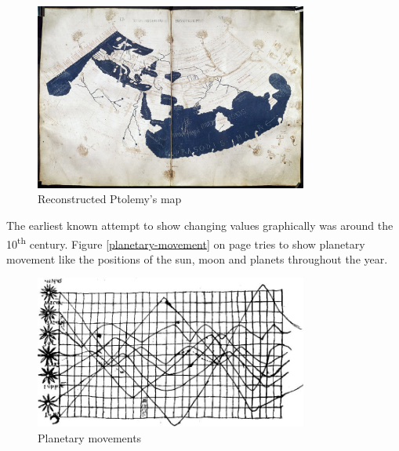 \begin{figure}[h]
\centering
\includegraphics[width=0.8\textwidth,keepaspectratio]{images/history/ptolemy-map.jpg}
\caption[
    Reconstructed Ptolemy's map, Urldate: 07.2016 \newline
\small\texttt{\url{https://upload.wikimedia.org/wikipedia/commons/2/23/PtolemyWorldMap.jpg}}
]{Reconstructed Ptolemy's map}
\label{fig:ptolemy}
\end{figure}

The earliest known attempt to show changing values graphically was around the 10\textsuperscript{th} century. Figure \ref{planetary-movement} on page \pageref{planetary-movement} tries to show planetary
movement like the positions of the sun, moon and planets throughout the year.

\begin{figure}[h]
\centering
\includegraphics[width=0.8\textwidth,keepaspectratio]{images/history/planetary-movement.jpg}
\caption[
    Planetary movements, Urldate: 07.2016 \newline
\small\texttt{\url{http://www.fi.uu.nl/wiskrant/artikelen/hist_grafieken/begin/images/planeten.gif}}
]{Planetary movements}
\label{fig:planetary-movement}
\end{figure}

